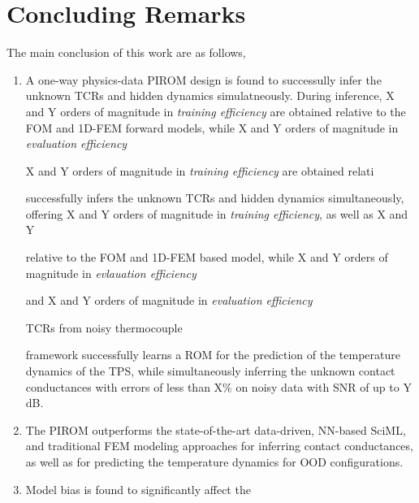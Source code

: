 \section{Concluding Remarks}

The main conclusion of this work are as follows,
\begin{enumerate}
    \item A one-way physics-data PIROM design is found to successully infer the unknown TCRs and hidden dynamics simulatneously. During inference, X and Y orders of magnitude in \emph{training efficiency} are obtained relative to the FOM and 1D-FEM forward models, while X and Y orders of magnitude in \emph{evaluation efficiency} 
    
    X and Y orders of magnitude in \emph{training efficiency} are obtained relati
    
    successfully infers the unknown TCRs and hidden dynamics simultaneously, offering X and Y orders of magnitude in \emph{training efficiency}, as well as X and Y
    
    relative to the FOM and 1D-FEM based model, while X and Y orders of magnitude in \emph{evlauation efficiency} 
    
    and X and Y orders of magnitude in \emph{evaluation efficiency}
    
    TCRs from noisy thermocouple 
    
    framework successfully learns a ROM for the prediction of the temperature dynamics of the TPS, while simultaneously inferring the unknown contact conductances with errors of less than X\% on noisy data with SNR of up to Y dB.
    \item The PIROM outperforms the state-of-the-art data-driven, NN-based SciML, and traditional FEM modeling approaches for inferring contact conductances, as well as for predicting the temperature dynamics for OOD configurations.
    \item Model bias is found to significantly affect the 
\end{enumerate}